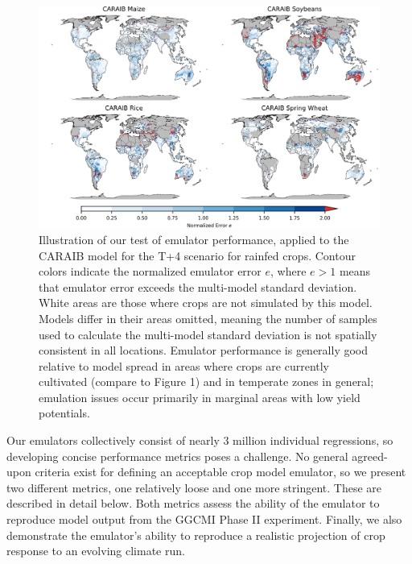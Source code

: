 \documentclass[gmd, manuscript]{copernicus} %
\begin{document}
\begin{figure}[ht]
\centering
    \includegraphics[width=16.3cm]{figures/CARAIB_spatial_error.png}
    \caption{
    Illustration of our test of emulator performance, applied to the CARAIB model for the T+4 scenario for rainfed crops. 
    Contour colors indicate the normalized emulator error $e$, where $e > 1$ means that emulator error exceeds the multi-model standard deviation. 
    White areas are those where crops are not simulated by this model. 
    Models differ in their areas omitted, meaning the number of samples used to calculate the multi-model standard deviation is not spatially consistent in all locations. 
    Emulator performance is generally good relative to model spread in areas where crops are currently cultivated (compare to Figure 1) and in temperate zones in general; emulation issues occur primarily in marginal areas with low yield potentials. 
    }
   \label{fig:error}
\end{figure}

Our emulators collectively consist of nearly 3 million individual regressions, so developing concise performance metrics poses a challenge.
No general agreed-upon criteria exist for defining an acceptable crop model emulator, so we present two different metrics, one relatively loose %
and one more stringent. 
These are described in detail below. Both metrics assess the ability of the emulator to reproduce model output from the GGCMI Phase II experiment. 
Finally, we also demonstrate the emulator's ability to reproduce a realistic projection of crop response to an evolving climate run. 
\end{document}
